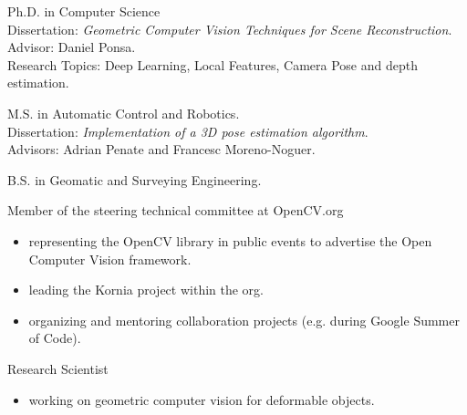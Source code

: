 \documentclass{article}
\begin{document}


\begin{llist}
\label{Education}

 
Ph.D. in Computer Science\\
Dissertation: \textit{Geometric Computer Vision Techniques for Scene Reconstruction}.\\
Advisor: Daniel Ponsa.\\
Research Topics: Deep Learning, Local Features, Camera Pose and depth estimation.

 
M.S. in Automatic Control and Robotics.\\
Dissertation: \textit{Implementation of a 3D pose estimation algorithm}.\\
Advisors: Adrian Penate and Francesc Moreno-Noguer.

 
B.S. in Geomatic and Surveying Engineering.


\label{Work Experience}
\vspace{-0.33cm}

\location{}
Member of the steering technical committee at OpenCV.org
\vspace{-0.33cm}
\begin{itemize}
 \item representing the OpenCV library in public events to advertise the Open Computer Vision framework.
 \item leading the Kornia project within the org.
 \item organizing and mentoring collaboration projects (e.g. during Google Summer of Code).
\end{itemize}

Research Scientist
\vspace{-0.33cm}
\begin{itemize}
 \item working on geometric computer vision for deformable objects.
\end{itemize}


\end{llist}
\end{document}

